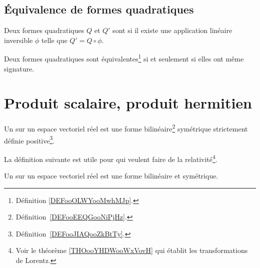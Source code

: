 \subsection{Équivalence de formes quadratiques}

\begin{definition}        \label{DEFooOLWYooMwhMJp}
	Deux formes quadratiques \( Q\) et \( Q'\) sont  si il existe une application linéaire inversible \( \phi\) telle que \( Q'=Q\circ \phi\).
\end{definition}

\begin{proposition}       \label{PROPooBWXMooLsgyKm}
	Deux formes quadratiques sont équivalentes\footnote{Définition \ref{DEFooOLWYooMwhMJp}.} si et seulement si elles ont même signature.
\end{proposition}


\section{Produit scalaire, produit hermitien}

\begin{definition}\label{DefVJIeTFj}
	Un  sur un espace vectoriel réel est une forme bilinéaire\footnote{Définition~\ref{DEFooEEQGooNiPjHz}.} symétrique strictement définie positive\footnote{Définition~\ref{DEFooJIAQooZkBtTy}.}.
\end{definition}

La définition suivante est utile pour  qui veulent faire de la relativité\footnote{Voir le théorème \ref{THOooYHDWooWxVovH} qui établit les transformations de Lorentz.}.
\begin{definition}      \label{DEFooLPBGooXLxubc}
	Un  sur un espace vectoriel réel est une forme bilinéaire et symétrique.
\end{definition}

